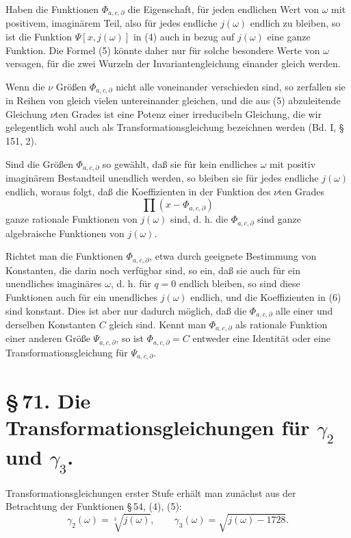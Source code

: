 \documentclass[11pt]{article}
\begin{document}
Haben die Funktionen $\Phi_{a,c,\partial}$ die Eigenschaft, für jeden endlichen Wert von $\omega$ mit positivem, imaginärem Teil, also für jedes endliche $j(\omega)$ endlich zu bleiben, so ist die Funktion $\Psi[x,j(\omega)]$ in (4) auch in bezug auf $j(\omega)$ eine ganze Funktion. Die Formel (5) könnte daher nur für solche besondere Werte von $\omega$ versagen, für die zwei Wurzeln der Invariantengleichung einander gleich werden.

Wenn die $\nu$ Größen $\Phi_{a,c,\partial}$ nicht alle voneinander verschieden sind, so zerfallen sie in Reihen von gleich vielen untereinander gleichen, und die aus (5) abzuleitende Gleichung $\nu$ten Grades ist eine Potenz einer irreducibeln Gleichung, die wir gelegentlich wohl auch als Transformationsgleichung bezeichnen werden (Bd. I, \S\,151, 2).

Sind die Größen $\Phi_{a,c,\partial}$ so gewählt, daß sie für kein endliches $\omega$ mit positiv imaginärem Bestandteil unendlich werden, so bleiben sie für jedes endliche $j(\omega)$ endlich, woraus folgt, daß die Koeffizienten in der Funktion des $\nu$ten Grades
\begin{equation}
 \prod(x-\Phi_{a,c,\partial})
\tag{6}
\end{equation}
ganze rationale Funktionen von $j(\omega)$ sind, d. h. die $\Phi_{a,c,\partial}$ sind ganze algebraische Funktionen von $j(\omega)$.

Richtet man die Funktionen $\Phi_{a,c,\partial}$, etwa durch geeignete Bestimmung von Konstanten, die darin noch verfügbar sind, so ein, daß sie auch für ein unendliches imaginäres $\omega$, d. h. für $q=0$ endlich bleiben, so sind diese Funktionen auch für ein unendliches $j(\omega)$ endlich, und die Koeffizienten in (6) sind konstant. Dies ist aber nur dadurch möglich, daß die $\Phi_{a,c,\partial}$ alle einer und derselben Konstanten $C$ gleich sind. Kennt man $\Phi_{a,c,\partial}$ als rationale Funktion einer anderen Größe $\Psi_{a,c,\partial}$, so ist $\Phi_{a,c,\partial}=C$ entweder eine Identität oder eine Transformationsgleichung für $\Psi_{a,c,\partial}$.

\section*{\S\,71. Die Transformationsgleichungen für $\gamma_2$ und $\gamma_3$.}

Transformationsgleichungen erster Stufe erhält man zunächst aus der Betrachtung der Funktionen \S\,54, (4), (5):
\[
 \gamma_2(\omega)=\sqrt[3]{j(\omega)},\qquad
 \gamma_3(\omega)=\sqrt{j(\omega)-1728}.
\]
\end{document}
